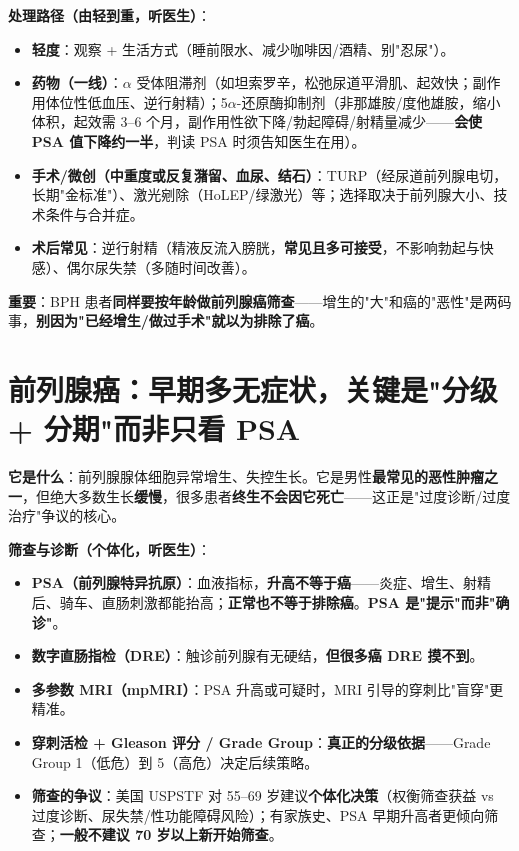 \documentclass[12pt,UTF8,openany]{ctexbook}
\begin{document}
\textbf{处理路径（由轻到重，听医生）}：
\begin{itemize}[leftmargin=2em,itemsep=0.3em]
  \item \textbf{轻度}：观察 + 生活方式（睡前限水、减少咖啡因/酒精、别"忍尿"）。
  \item \textbf{药物（一线）}：$\alpha$ 受体阻滞剂（如坦索罗辛，松弛尿道平滑肌、起效快；副作用体位性低血压、逆行射精）；5$\alpha$-还原酶抑制剂（非那雄胺/度他雄胺，缩小体积，起效需 3--6 个月，副作用性欲下降/勃起障碍/射精量减少——\textbf{会使 PSA 值下降约一半}，判读 PSA 时须告知医生在用）。
  \item \textbf{手术/微创（中重度或反复潴留、血尿、结石）}：TURP（经尿道前列腺电切，长期"金标准"）、激光剜除（HoLEP/绿激光）等；选择取决于前列腺大小、技术条件与合并症。
  \item \textbf{术后常见}：逆行射精（精液反流入膀胱，\textbf{常见且多可接受}，不影响勃起与快感）、偶尔尿失禁（多随时间改善）。
\end{itemize}

\noindent\textbf{重要}：BPH 患者\textbf{同样要按年龄做前列腺癌筛查}——增生的"大"和癌的"恶性"是两码事，\textbf{别因为"已经增生/做过手术"就以为排除了癌}。

\section{前列腺癌：早期多无症状，关键是"分级 + 分期"而非只看 PSA}

\textbf{它是什么}：前列腺腺体细胞异常增生、失控生长。它是男性\textbf{最常见的恶性肿瘤之一}，但绝大多数生长\textbf{缓慢}，很多患者\textbf{终生不会因它死亡}——这正是"过度诊断/过度治疗"争议的核心。

\textbf{筛查与诊断（个体化，听医生）}：
\begin{itemize}[leftmargin=2em,itemsep=0.3em]
  \item \textbf{PSA（前列腺特异抗原）}：血液指标，\textbf{升高不等于癌}——炎症、增生、射精后、骑车、直肠刺激都能抬高；\textbf{正常也不等于排除癌}。\textbf{PSA 是"提示"而非"确诊"}。
  \item \textbf{数字直肠指检（DRE）}：触诊前列腺有无硬结，\textbf{但很多癌 DRE 摸不到}。
  \item \textbf{多参数 MRI（mpMRI）}：PSA 升高或可疑时，MRI 引导的穿刺比"盲穿"更精准。
  \item \textbf{穿刺活检 + Gleason 评分 / Grade Group}：\textbf{真正的分级依据}——Grade Group 1（低危）到 5（高危）决定后续策略。
  \item \textbf{筛查的争议}：美国 USPSTF 对 55--69 岁建议\textbf{个体化决策}（权衡筛查获益 vs 过度诊断、尿失禁/性功能障碍风险）；有家族史、PSA 早期升高者更倾向筛查；\textbf{一般不建议 70 岁以上新开始筛查}。
\end{itemize}
\end{document}
